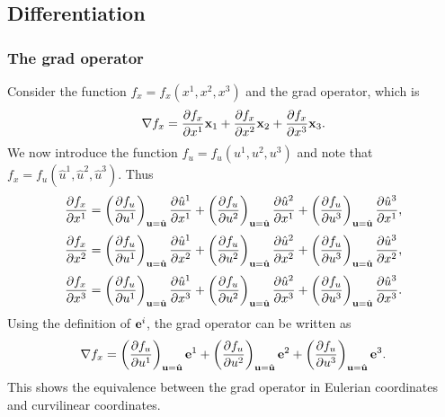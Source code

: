 \documentclass[11pt]{article}
\newcommand{\uhat}{\hat{u}}
\begin{document}
\subsection{Differentiation}
\subsubsection{The grad operator}
Consider the function $f_x = f_x(x^1, x^2, x^3)$ and the grad operator, which is  
\begin{equation}
    \nabla f_x = \frac{\partial f_x}{\partial x^1} \mathbf{x}_1 + \frac{\partial f_x}{\partial x^2} \mathbf{x}_2 + \frac{\partial f_x}{\partial x^3} \mathbf{x}_3.
\end{equation}
We now introduce the function $f_u = f_u(u^1,u^2,u^3)$ and note that $f_x = f_u(\uhat^1,\uhat^2,\uhat^3)$. Thus
\begin{equation}
    \frac{\partial f_x}{\partial x^1} = \left ( \frac{ \partial f_u}{\partial u^1} \right)_{\uvec = \hat{\uvec}}        \frac{\partial \uhat^1}{\partial x^1} + 
                     \left ( \frac{ \partial f_u}{\partial u^2} \right)_{\uvec = \hat{\uvec}} \frac{\partial \uhat^2}{\partial x^1} +
                     \left ( \frac{ \partial f_u}{\partial u^3} \right)_{\uvec = \hat{\uvec}} \frac{\partial \uhat^3}{\partial x^1}, 
\end{equation}
\begin{equation}
    \frac{\partial f_x}{\partial x^2} = \left ( \frac{ \partial f_u}{\partial u^1} \right)_{\uvec = \hat{\uvec}} \frac{\partial \uhat^1}{\partial x^2} + 
                     \left ( \frac{ \partial f_u}{\partial u^2} \right)_{\uvec = \hat{\uvec}} \frac{\partial \uhat^2}{\partial x^2} +
                     \left ( \frac{ \partial f_u}{\partial u^3} \right)_{\uvec = \hat{\uvec}} \frac{\partial \uhat^3}{\partial x^2},
\end{equation}
\begin{equation}
    \frac{\partial f_x}{\partial x^3} = \left ( \frac{ \partial f_u}{\partial u^1} \right)_{\uvec = \hat{\uvec}} \frac{\partial \uhat^1}{\partial x^3} + 
                     \left ( \frac{ \partial f_u}{\partial u^2} \right)_{\uvec = \hat{\uvec}} \frac{\partial \uhat^2}{\partial x^3} +
                     \left ( \frac{ \partial f_u}{\partial u^3} \right)_{\uvec = \hat{\uvec}} \frac{\partial \uhat^3}{\partial x^3} .
\end{equation}
Using the definition of $\mathbf{e}^i$, the grad operator can be written as
\begin{equation}
    \nabla f_x = \left ( \frac{\partial f_u }{\partial u^1} \right )_{\mathbf{u} = \hat{\mathbf{u}}} \mathbf{e}^1 + \left ( \frac{\partial f_u }{\partial u^2} \right )_{\mathbf{u} = \hat{\mathbf{u}}} \mathbf{e}^2 + \left ( \frac{\partial f_u }{\partial u^3} \right )_{\mathbf{u} = \hat{\mathbf{u}}} \mathbf{e}^3 .
\end{equation}
This shows the equivalence between the grad operator in Eulerian coordinates and curvilinear coordinates.
\end{document}
